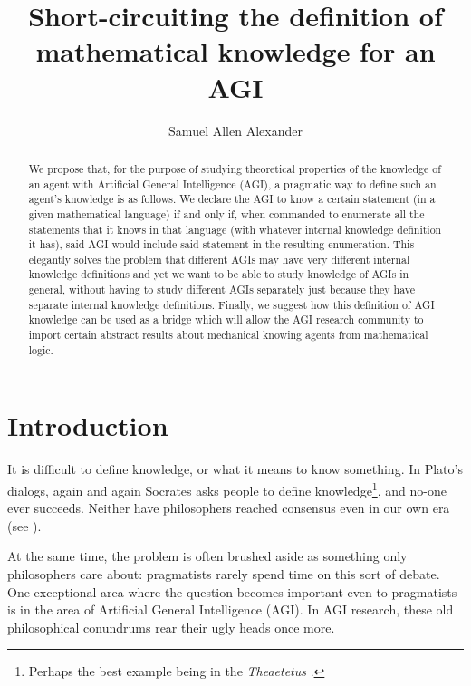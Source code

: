 \documentclass[runningheads]{llncs}
\begin{document}
\title{Short-circuiting the definition of mathematical knowledge for an AGI
}


\author{Samuel Allen
Alexander}



\maketitle

\begin{abstract}
We propose that, for the purpose of studying theoretical properties of
the knowledge of an agent with Artificial General Intelligence (AGI),
a pragmatic way to define such an agent's knowledge is as follows.
We declare the AGI to know a certain statement
(in a given mathematical language) if and only if, when commanded
to enumerate all the statements that it knows in that language
(with whatever internal knowledge definition it has), said AGI
would include said statement in the resulting enumeration.
This elegantly solves the problem that different AGIs may have
very different internal knowledge definitions and yet we want
to be able to study knowledge of AGIs in general, without having
to study different AGIs separately just because they have separate
internal knowledge definitions. Finally, we suggest how this
definition of AGI knowledge can be used as a bridge which will
allow the AGI research community to import certain abstract results
about mechanical knowing agents from mathematical logic.
\end{abstract}

\section{Introduction}

It is difficult to define knowledge, or what it means to know something.
In Plato's dialogs, again and again Socrates asks people to define
knowledge\footnote{Perhaps the best example being in the \emph{Theaetetus}
\cite{theaetetus}.}, and no-one ever succeeds. Neither have philosophers
reached consensus even in our own era (see \cite{sep-knowledge-analysis}).

At the same time, the problem is often brushed aside as something only
philosophers care about: pragmatists rarely spend time
on this sort of debate. One exceptional area where the question becomes
important even to pragmatists is in the area of Artificial General Intelligence
(AGI). In AGI research, these old philosophical conundrums rear their ugly heads
once more.
\end{document}
